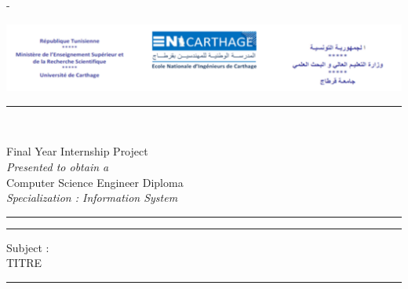 %
%
% 
%
%
\begin{titlingpage}
\begin{SingleSpace}
\calccentering{\unitlength} 
\begin{adjustwidth*}{\unitlength}{-\unitlength}
\begin{center}
\includegraphics[scale=0.5]{logos/Entete}\\
{\color{cyan}\rule[0.5ex]{\linewidth}{1pt}\\[\baselineskip]}
{\HUGE Final Year Internship Project }\\[4mm]
{\normalsize \textit{Presented to obtain a }}\\[3mm]
{\LARGE Computer Science Engineer Diploma }\\[3mm]
{\normalsize \textit{ Specialization : Information System }}\\[4mm]

{\color{cyan}\rule[0.5ex]{\linewidth}{2pt}\vspace*{-\baselineskip}\vspace{3.2pt}}
{\color{cyan}\rule[0.5ex]{\linewidth}{0.5pt}}


{\normalsize Subject :}\\[3mm]
{\LARGE TITRE }\\


{\color{cyan}\rule[0.5ex]{\linewidth}{0.5pt}\vspace*{-\baselineskip}\vspace{3.2pt}}


\end{center}
\end{adjustwidth*}
\end{SingleSpace}
\end{titlingpage}
